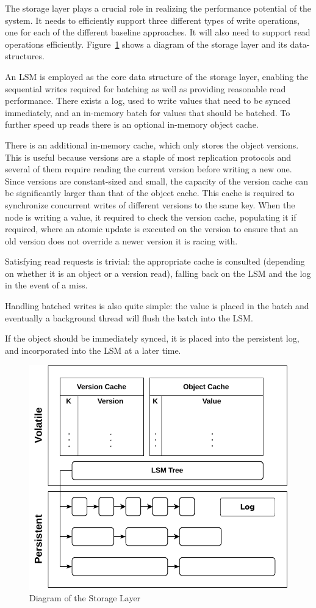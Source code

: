 The storage layer plays a crucial role in realizing the
performance potential of the system. It needs to efficiently support
three different types of write operations, one for each of the
different baseline approaches. It will also need to support read operations
efficiently. Figure~\ref{fig:storage_layer} shows a diagram of
the storage layer and its data-structures.

An \ac{LSM} is employed as the core data structure of the storage
layer, enabling the sequential writes required for batching as
well as providing reasonable read performance. There exists a
log, used to write values that need to be synced immediately, and
an in-memory batch for values that should be batched. To further speed
up reads there is an optional in-memory object cache.

There is an additional in-memory cache, which only stores the
object versions. This is useful because versions are a staple of
most replication protocols and several of them require reading
the current version before writing a new one. Since versions are
constant-sized and small, the capacity of the version cache can
be significantly larger than that of the object cache. This cache
is required to synchronize concurrent writes of different
versions to the same key. When the node is writing a value, it required to
check the version cache, populating it if required, where an
atomic update is executed on the version to ensure that an old
version does not override a newer version it is racing with.

Satisfying read requests is trivial: the appropriate cache is
consulted (depending on whether it is an object or a version
read), falling back on the \ac{LSM} and the log in the event of a miss.

Handling batched writes is also quite simple: the
value is placed in the batch and eventually a background thread
will flush the batch into the \ac{LSM}.

If the object should be immediately synced, it is placed into the
persistent log, and incorporated into the \ac{LSM} at a later
time.

\begin{figure}[t]
    \centering
    \includegraphics[width=.75\linewidth]{img/storage_layer}
    \caption{Diagram of the Storage Layer}\label{fig:storage_layer}
\end{figure}

